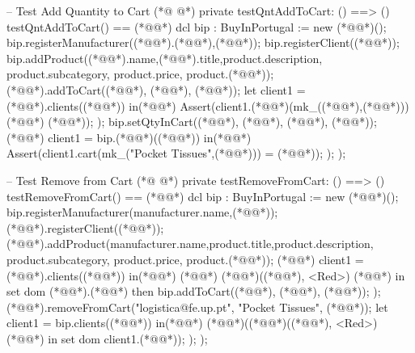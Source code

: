 \begin{vdmpp}[breaklines=true]
 -- Test Add Quantity to Cart
(*@
\label{testQntAddToCart:266}
@*)
 private testQntAddToCart: () ==> ()
 testQntAddToCart() == (*@\vdmnotcovered{(}@*)
  dcl bip : BuyInPortugal := new (*@@*)();
  bip.registerManufacturer((*@@*).(*@@*),(*@@*));
  bip.registerClient((*@@*));
  bip.addProduct((*@@*).name,(*@@*).title,product.description, product.subcategory, product.price, product.(*@@*));
  (*@@*).addToCart((*@@*), (*@@*), (*@@*));
  let client1 = (*@@*).clients((*@@*))
  in(*@\vdmnotcovered{(}@*)
   Assert(client1.(*@@*)(mk_((*@@*),(*@@*))) (*@\vdmnotcovered{=}@*) (*@@*));
  );
  bip.setQtyInCart((*@@*), (*@@*), (*@@*), (*@@*));
  (*@@*) client1 = bip.(*@@*)((*@@*))
  in(*@\vdmnotcovered{(}@*)
   Assert(client1.cart(mk_("Pocket Tissues",(*@@*))) = (*@@*));
  );
 );
 
 -- Test Remove from Cart
(*@
\label{testRemoveFromCart:285}
@*)
 private testRemoveFromCart: () ==> ()
 testRemoveFromCart() == (*@\vdmnotcovered{(}@*)
  dcl bip : BuyInPortugal := new (*@@*)();
  bip.registerManufacturer(manufacturer.name,(*@@*));
  (*@@*).registerClient((*@@*));
  (*@@*).addProduct(manufacturer.name,product.title,product.description, product.subcategory, product.price, product.(*@@*));
  (*@@*) client1 = (*@@*).clients((*@@*))
  in(*@\vdmnotcovered{(}@*)
   (*@@*) (*@@*)((*@@*), <Red>) (*@@*) in set dom (*@@*).(*@@*) then
    bip.addToCart((*@@*), (*@@*), (*@@*));
  );
  (*@@*).removeFromCart("logistica@fe.up.pt", "Pocket Tissues", (*@@*));
  let client1 = bip.clients((*@@*))
  in(*@\vdmnotcovered{(}@*)
   (*@@*)((*@@*)((*@@*), <Red>) (*@@*) in set dom client1.(*@@*));
  );
 );
 

\end{vdmpp}
